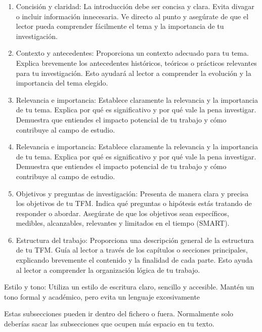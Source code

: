 \begin{enumerate}

\item Concisión y claridad: La introducción debe ser concisa y clara. Evita divagar o incluir información innecesaria. Ve directo al punto y asegúrate de que el lector pueda comprender fácilmente el tema y la importancia de tu investigación.

\item Contexto y antecedentes: Proporciona un contexto adecuado para tu tema. Explica brevemente los antecedentes históricos, teóricos o prácticos relevantes para tu investigación. Esto ayudará al lector a comprender la evolución y la importancia del tema elegido.

\item Relevancia e importancia: Establece claramente la relevancia y la importancia de tu tema. Explica por qué es significativo y por qué vale la pena investigar. Demuestra que entiendes el impacto potencial de tu trabajo y cómo contribuye al campo de estudio.

\item Relevancia e importancia: Establece claramente la relevancia y la importancia de tu tema. Explica por qué es significativo y por qué vale la pena investigar. Demuestra que entiendes el impacto potencial de tu trabajo y cómo contribuye al campo de estudio.

\item Objetivos y preguntas de investigación: Presenta de manera clara y precisa los objetivos de tu TFM. Indica qué preguntas o hipótesis estás tratando de responder o abordar. Asegúrate de que los objetivos sean específicos, medibles, alcanzables, relevantes y limitados en el tiempo (SMART).

\item Estructura del trabajo: Proporciona una descripción general de la estructura de tu TFM. Guía al lector a través de los capítulos o secciones principales, explicando brevemente el contenido y la finalidad de cada parte. Esto ayuda al lector a comprender la organización lógica de tu trabajo.

\end{enumerate}

Estilo y tono: Utiliza un estilo de escritura claro, sencillo y accesible. Mantén un tono formal y académico, pero evita un lenguaje excesivamente

Estas subsecciones pueden ir dentro del fichero o fuera. Normalmente solo deberías sacar las subsecciones que ocupen más espacio en tu texto.









